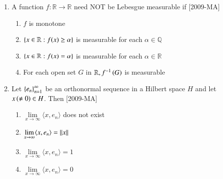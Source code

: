 \documentclass[journal]{IEEEtran}
\begin{document}
\begin{enumerate}
\item A function $f:\mathbb R \rightarrow \mathbb R$ need NOT be Lebesgue measurable if \hfill{[2009-MA]}
\begin{enumerate}
    \item $f$ is monotone
    \item $\left\{x \in \mathbb R:f(x) \geq \alpha\right\}$ is measurable for each $\alpha \in \mathbb Q$
    \item $\left\{x \in \mathbb R:f(x) = \alpha\right\}$ is measurable for each $\alpha \in \mathbb R$
    \item For each open set $G$ in $\mathbb R, f^{-1}\left(G\right)$ is measurable
\end{enumerate}

\item Let $\left\{e_n\right\}_{n=1}^\infty$ be an orthonormal sequence in a Hilbert space $H$ and let $x\left(\neq 0\right) \in H$. Then \hfill{[2009-MA]}
\begin{enumerate}
    \item $\lim\limits_{x\to \infty} \langle x, e_n \rangle $ does not exist
    \item $\lim\limits_{x\to \infty} \langle x, e_n \rangle =\left\vert\left\vert x\right\vert\right\vert$
    \item $\lim\limits_{x\to \infty} \langle x, e_n \rangle =1$
    \item $\lim\limits_{x\to \infty} \langle x, e_n \rangle =0$
\end{enumerate}
\end{enumerate}
\end{document}
